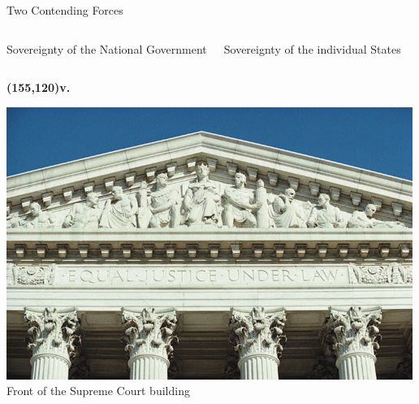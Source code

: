 \begin{frame}{Two Contending Forces}
    \begin{columns}[onlytextwidth]
            \begin{varblock}[0.9\textwidth]{}\huge{ \centering Sovereignty of the National Government \\}\end{varblock}

            \begin{varblock}[0.9\textwidth]{}\huge{ \centering Sovereignty of the individual States \\}\end{varblock}
    \end{columns}
    \textbf{\huge{ \color{red}
        \Put(155,120){v.}
    }}
\end{frame}

\begin{frame}
    \centering
    \includegraphics[width=.9\textwidth]{img/supremecourtfasces.jpg} \\
    \large{ Front of the Supreme Court building } \\
\end{frame}

